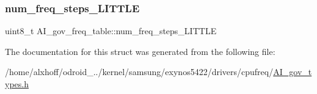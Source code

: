 \subsubsection{\texorpdfstring{num\+\_\+freq\+\_\+steps\+\_\+\+L\+I\+T\+T\+LE}{num\_freq\_steps\_LITTLE}}
{\footnotesize\ttfamily uint8\+\_\+t A\+I\+\_\+gov\+\_\+freq\+\_\+table\+::num\+\_\+freq\+\_\+steps\+\_\+\+L\+I\+T\+T\+LE}



The documentation for this struct was generated from the following file\+:\begin{DoxyCompactItemize}
\item 
/home/alxhoff/odroid\+\_../kernel/samsung/exynos5422/drivers/cpufreq/\hyperlink{AI__gov__types_8h}{A\+I\+\_\+gov\+\_\+types.\+h}\end{DoxyCompactItemize}
